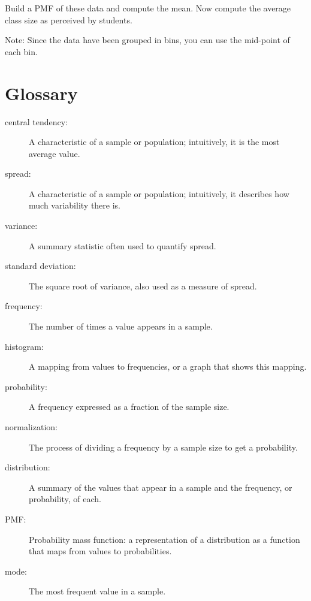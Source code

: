 \documentclass[12pt]{book}
\begin{document}
\begin{ex}
Build a PMF of these data and compute the mean.  Now compute the
average class size as perceived by students.

Note: Since the data have been grouped in bins, you can use the
mid-point of each bin.
\end{ex}


\section{Glossary}

\begin{description}

\item[central tendency:] A characteristic of a sample or population;
intuitively, it is the most average value. 

\item[spread:] A characteristic of a sample or population;
intuitively, it describes how much variability there is.

\item[variance:] A summary statistic often used to quantify spread.

\item[standard deviation:] The square root of variance, also used
as a measure of spread.

\item[frequency:] The number of times a value appears in a sample.

\item[histogram:] A mapping from values to frequencies, or a graph
that shows this mapping.

\item[probability:] A frequency expressed as a fraction of the sample
size.

\item[normalization:] The process of dividing a frequency by a sample
size to get a probability.

\item[distribution:] A summary of the values that appear in a sample
and the frequency, or probability, of each.

\item[PMF:] Probability mass function: a representation of a distribution
as a function that maps from values to probabilities.

\item[mode:] The most frequent value in a sample.


\end{description}
\end{document}
